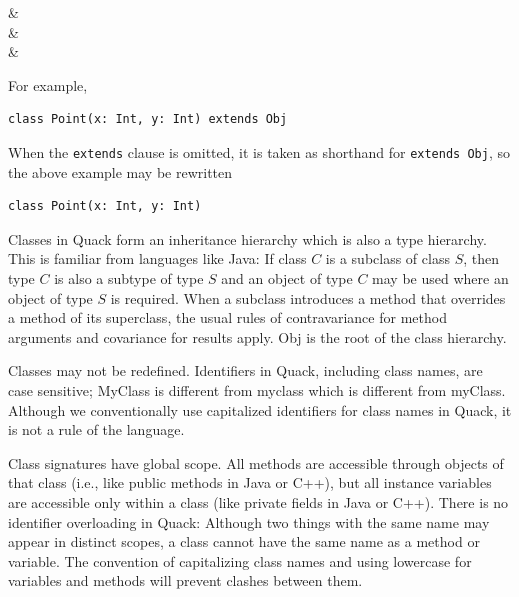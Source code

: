 \documentclass[11pt]{article}
\begin{document}
\begin{grammar}
 & 
\\[1ex]
 & 
     
  \literal{(}  \literal{)}
  \\
 & 
\end{grammar}

\noindent For example, 
\begin{verbatim}
class Point(x: Int, y: Int) extends Obj
\end{verbatim}

When the \verb|extends| clause is omitted, it is taken as 
shorthand for \verb|extends Obj|, so the above example may be
rewritten 
\begin{verbatim}
class Point(x: Int, y: Int)
\end{verbatim}


Classes in Quack form an inheritance hierarchy which is also a type
hierarchy.  This is familiar from languages like Java:  If class $C$
is a subclass of class $S$, then type $C$ is also a subtype of type
$S$ and an object of type $C$ may be used where an object of type $S$
is required.   When a subclass introduces a method that overrides a
method of its superclass, the usual rules of contravariance for method arguments and
covariance for results apply.   Obj is the root of the class
hierarchy.  

Classes may not be redefined.  Identifiers in Quack, including class
names, are case sensitive; MyClass is different from myclass which is
different from myClass.  Although we conventionally use capitalized
identifiers for class names in Quack, it is not a rule of the
language.  

Class signatures have global scope.  All methods are accessible
through objects of that class (i.e., like public methods in Java or C++), but
all instance variables are accessible only within a class (like
private fields in Java or C++).  There is no identifier overloading in
Quack: Although two things with the same name may appear in distinct
scopes,  a class cannot have the same name as a method or
variable.  The convention of capitalizing class names and using
lowercase for variables and methods will prevent clashes between
them. 
\end{document}
